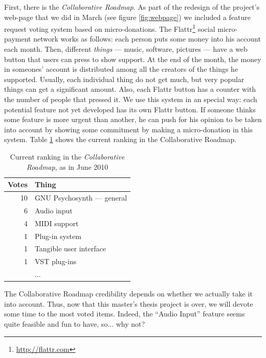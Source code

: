 First, there is the \emph{Collaborative Roadmap}. As part of the
redesign of the project's web-page that we did in March (see figure
\ref{fig:webpage}) we included a feature request voting system based
on micro-donations. The Flattr\footnote{\url{http://flattr.com}}
social micro-payment network works as follows: each person puts some
money into his account each month. Then, different \emph{things} ---
music, software, pictures --- have a web button that users can press
to show support. At the end of the month, the money in someones'
account is distributed among all the creators of the things he
supported. Usually, each individual thing do not get much, but very
popular things can get a significant amount. Also, each Flattr button
has a counter with the number of people that pressed it. We use this
system in an special way: each potential feature not yet developed has
its own Flattr button. If someone thinks some feature is more urgent
than another, he can push for his opinion to be taken into account by
showing some commitment by making a micro-donation in this
system. Table \ref{tab:flattr} shows the current ranking in the
Collaborative Roadmap.

\begin{table}[h]
  \centering
  \begin{tabular}{r|l}
    Votes & Thing \\ \hline
    10 & GNU Psychosynth --- general \\
    6 & Audio input \\
    4 & MIDI support \\
    1 & Plug-in system \\
    1 & Tangible user interface \\
    1 & VST plug-ins \\
    & ...
  \end{tabular}
  \caption{Current ranking in the \emph{Collaborative Roadmap}, as in June 2010}
  \label{tab:flattr}
\end{table}

The Collaborative Roadmap credibility depends on whether we actually
take it into account. Thus, now that this master's thesis project is
over, we will devote some time to the most voted items. Indeed, the
``Audio Input'' feature seems quite feasible and fun to have,
so... why not?

